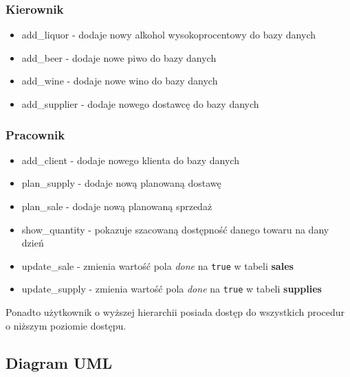 \documentclass[12pt,a4paper]{article}
\begin{document}
    \subsubsection*{Kierownik}
        \begin{itemize}
            \item \textsf{add\_liquor} - dodaje nowy alkohol wysokoprocentowy do bazy danych
            \item \textsf{add\_beer} - dodaje nowe piwo do bazy danych
            \item \textsf{add\_wine} - dodaje nowe wino do bazy danych
            \item \textsf{add\_supplier} - dodaje nowego dostawcę do bazy danych
        \end{itemize}
    
    \subsubsection*{Pracownik}
        \begin{itemize}
            \item \textsf{add\_client} - dodaje nowego klienta do bazy danych
            \item \textsf{plan\_supply} - dodaje nową planowaną dostawę
            \item \textsf{plan\_sale} - dodaje nową planowaną sprzedaż
            \item \textsf{show\_quantity} - pokazuje szacowaną dostępność danego towaru na dany dzień
            \item \textsf{update\_sale} - zmienia wartość pola \textit{done} na \texttt{true} w tabeli \textbf{sales}
            \item \textsf{update\_supply} - zmienia wartość pola \textit{done} na \texttt{true} w tabeli \textbf{supplies}
        \end{itemize}
        
        Ponadto użytkownik o wyższej hierarchii posiada dostęp do wszystkich procedur o niższym poziomie dostępu.
        
\subsection*{Diagram UML}
        
\end{document}
